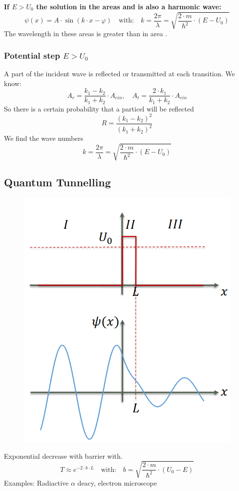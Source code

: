 \textbf{If \(E > U_0\) the solution in the areas  and  is also a harmonic wave:}
\begin{equation*}
    \psi(x) = A\cdot \sin(k\cdot x-\varphi)\quad\text{with:}\quad k= \frac{2\pi}{\lambda} = \sqrt{\frac{2\cdot m}{\hbar^2}\cdot(E-U_0)}
\end{equation*}
The wavelength in these areas is greater than in area .
\subsubsection{Potential step \(E > U_0\)}
A part of the incident wave is reflected or transmitted at each transition. We know:
\begin{equation*}
    A_r = \frac{k_1 - k_2}{k_1 + k_2}\cdot A_{ein}, \quad A_t = \frac{2\cdot k_1}{k_1 + k_2} \cdot A_{ein}
\end{equation*}
So there is a certain probability that a particel will be reflected
\begin{equation*}
    R = \frac{(k_1 -k_2)^2}{(k_1 + k_2)^2}
\end{equation*}
We find the wave numbers
\begin{equation*}
    k = \frac{2\pi}{\lambda} = \sqrt{\frac{2 \cdot m}{\hbar^2}\cdot (E-U_0)}
\end{equation*}
\subsection{Quantum Tunnelling}
\begin{figure}[h]
    \centering
    \includegraphics[width=0.4\columnwidth]{images/tunnel.png}
    \label{fig:tunnel}
\end{figure}
Exponential decrease with barrier with.
\begin{equation*}
    T \approx e^{-2\cdot b\cdot L} \quad\text{with:}\quad b = \sqrt{\frac{2\cdot m}{\hbar^2}\cdot (U_0 - E)}
\end{equation*}
Examples: Radiactive \(\alpha\) deacy, electron microscope
